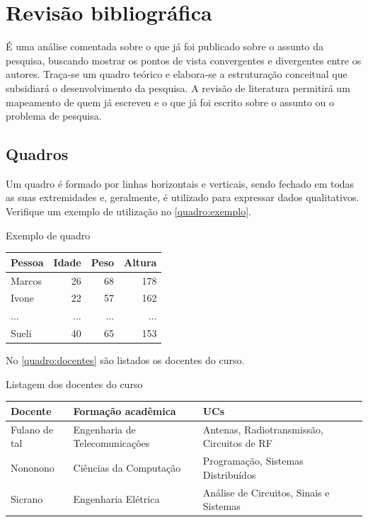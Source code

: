 \chapter{Revisão bibliográfica}\label{cap:revisao}

É uma análise comentada sobre o que já foi publicado sobre o assunto da pesquisa, buscando mostrar os pontos de vista convergentes e divergentes entre os autores. Traça-se um quadro teórico e elabora-se a estruturação conceitual que subsidiará o desenvolvimento da pesquisa. A revisão de literatura permitirá um mapeamento de quem já escreveu e o que já foi escrito sobre o assunto ou o problema de pesquisa.


\section{Quadros}\label{sec:quadros}


Um quadro é formado por linhas horizontais e verticais, sendo fechado em todas as suas extremidades e, geralmente, é utilizado para expressar dados qualitativos. Verifique um exemplo de utilização no \autoref{quadro:exemplo}.


\begin{quadro}[htb]
    \caption{Exemplo de quadro}\label{quadro:exemplo}
    \begin{tabular}{|l|r|r|r|}
        \hline
        \textbf{Pessoa} & \textbf{Idade} & \textbf{Peso} & \textbf{Altura} \\ \hline
        Marcos          & 26             & 68            & 178             \\ \hline
        Ivone           & 22             & 57            & 162             \\ \hline
        ...             & ...            & ...           & ...             \\ \hline
        Sueli           & 40             & 65            & 153             \\ \hline
    \end{tabular}
    \fonteproprioautor
\end{quadro}

No \autoref{quadro:docentes} são listados os docentes do curso.

\begin{quadro}[htb]
    \centering
    \caption{Listagem dos docentes do curso}\label{quadro:docentes}
    \footnotesize
    \begin{tabular}{|l|l|l|}
        \hline
        \textbf{Docente} & \textbf{Formação acadêmica}    & \textbf{UCs}                               \\ \hline
        Fulano de tal    & Engenharia de Telecomunicações & Antenas, Radiotransmissão, Circuitos de RF \\ \hline
        Nononono         & Ciências da Computação         & Programação, Sistemas Distribuídos         \\ \hline
        Sicrano          & Engenharia Elétrica            & Análise de Circuitos, Sinais e Sistemas    \\ \hline
    \end{tabular}
    \fonteproprioautor
\end{quadro}


